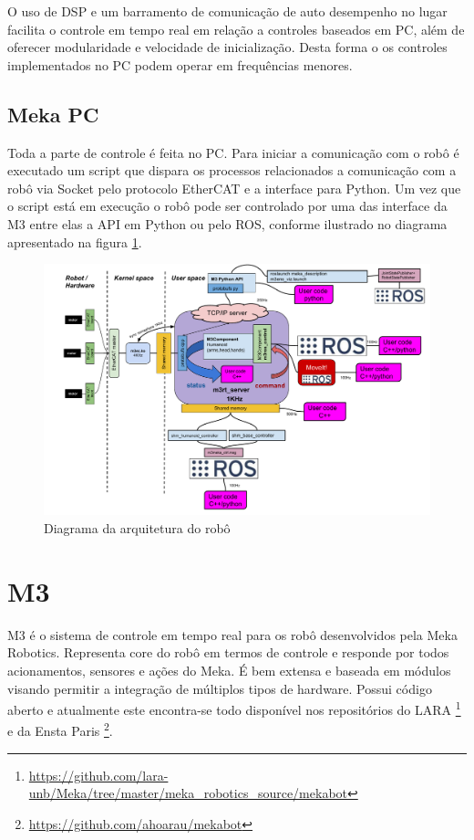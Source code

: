 O uso de DSP e um barramento de comunicação de auto desempenho no lugar facilita o controle em tempo real em relação a controles baseados em PC, além de oferecer modularidade e velocidade de inicialização\cite{edsinger2004domo}. Desta forma o os controles implementados no PC podem operar em frequências menores.


\subsection{Meka PC}

Toda a parte de controle é feita no PC. Para iniciar a comunicação com o robô é executado um script que dispara os processos relacionados a comunicação com a robô via Socket pelo protocolo EtherCAT e a interface para Python. Um vez que o script está em execução o robô pode ser controlado por uma das interface da M3 entre elas a API em Python ou pelo ROS, conforme ilustrado no diagrama apresentado na figura \ref{fig:mekaarch}.

\begin{figure}[H]
    \centering
    \includegraphics[width=0.9\linewidth]{figs/m3_arch.pdf}
    \caption{Diagrama da arquitetura do robô \cite{hoarau_2015}}
    \label{fig:mekaarch}
\end{figure}

\section{M3}

M3 é o sistema de controle em tempo real para os robô desenvolvidos pela Meka Robotics. Representa core do robô em termos de controle e responde por todos acionamentos, sensores e ações do Meka. É bem extensa e baseada em módulos visando permitir a integração de múltiplos tipos de hardware. Possui código aberto e atualmente este encontra-se todo disponível nos repositórios do LARA \footnote{\url{https://github.com/lara-unb/Meka/tree/master/meka_robotics_source/mekabot}} e da Ensta Paris \footnote{\url{https://github.com/ahoarau/mekabot}}.

